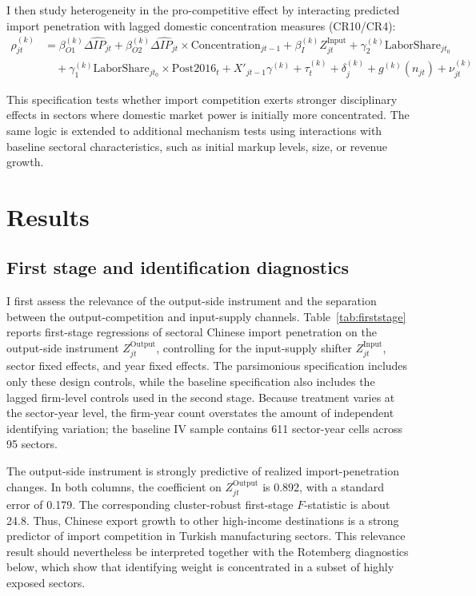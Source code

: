 \documentclass[12pt]{article}
\begin{document}
I then study heterogeneity in the pro-competitive effect by interacting predicted import penetration with lagged domestic concentration measures (CR10/CR4):
\begin{equation}
\begin{aligned}
\rho_{jt}^{(k)} &= \beta_{O1}^{(k)} \widehat{\Delta IP_{jt}} + \beta_{O2}^{(k)} \widehat{\Delta IP_{jt}} \times \text{Concentration}_{jt-1} + \beta_I^{(k)} Z_{jt}^{\text{Input}}  + \gamma_2^{(k)} \text{LaborShare}_{jt_0} \\
&\quad + \gamma_1^{(k)} \text{LaborShare}_{jt_0} \times \text{Post2016}_t + X'_{jt-1} \gamma^{(k)} + \tau_t^{(k)} + \delta_j^{(k)} + g^{(k)}(n_{jt}) + \nu_{jt}^{(k)}
\end{aligned}
\end{equation}

This specification tests whether import competition exerts stronger disciplinary effects in sectors where domestic market power is initially more concentrated. The same logic is extended to additional mechanism tests using interactions with baseline sectoral characteristics, such as initial markup levels, size, or revenue growth.

\section{Results}

\subsection{First stage and identification diagnostics}
\label{sec:first_stage_diagnostics}

I first assess the relevance of the output-side instrument and the separation between the output-competition and input-supply channels. Table~\ref{tab:firststage} reports first-stage regressions of sectoral Chinese import penetration on the output-side instrument \(Z^{\text{Output}}_{jt}\), controlling for the input-supply shifter \(Z^{\text{Input}}_{jt}\), sector fixed effects, and year fixed effects. The parsimonious specification includes only these design controls, while the baseline specification also includes the lagged firm-level controls used in the second stage. Because treatment varies at the sector-year level, the firm-year count overstates the amount of independent identifying variation; the baseline IV sample contains 611 sector-year cells across 95 sectors.

The output-side instrument is strongly predictive of realized import-penetration changes. In both columns, the coefficient on \(Z^{\text{Output}}_{jt}\) is 0.892, with a standard error of 0.179. The corresponding cluster-robust first-stage \(F\)-statistic is about 24.8. Thus, Chinese export growth to other high-income destinations is a strong predictor of import competition in Turkish manufacturing sectors. This relevance result should nevertheless be interpreted together with the Rotemberg diagnostics below, which show that identifying weight is concentrated in a subset of highly exposed sectors.
\end{document}
